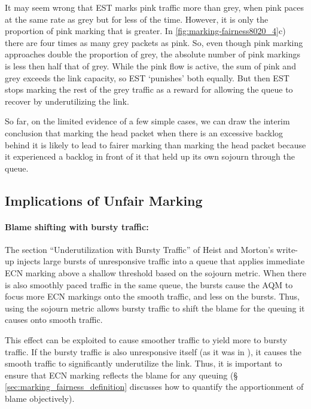 It may seem wrong that EST marks pink traffic more than grey, when pink paces at the same rate as grey but for less of the time. However, it is only the proportion of pink marking that is greater. In \autoref{fig:marking-fairness8020_4}c) there are four times as many grey packets as pink. So, even though pink marking approaches double the proportion of grey, the absolute number of pink markings is less then half that of grey. While the pink flow is active, the sum of pink and grey exceeds the link capacity, so EST `punishes' both equally. But then EST stops marking the rest of the grey traffic as a reward for allowing the queue to recover by underutilizing the link.

So far, on the limited evidence of a few simple cases, we can draw the interim conclusion that marking the head packet when there is an excessive backlog behind it is likely to lead to fairer marking than marking the head packet because it experienced a backlog in front of it that held up its own sojourn through the queue. 

\subsection{Implications of Unfair Marking}\label{sec:effects_unfair_marking}

\paragraph{Blame shifting with bursty traffic:} The section ``Underutilization with Bursty Traffic'' of Heist and Morton's write-up \cite{Heist20:L4S_tests} injects large bursts of unresponsive traffic into a queue that applies immediate ECN marking above a shallow threshold based on the sojourn metric. When there is also smoothly paced traffic in the same queue, the bursts cause the AQM to focus more ECN markings onto the smooth traffic, and less on the bursts. Thus, using the sojourn metric allows bursty traffic to shift the blame for the queuing it causes onto smooth traffic.

This effect can be exploited to cause smoother traffic to yield more to bursty traffic. If the bursty traffic is also unresponsive itself (as it was in \cite{Heist20:L4S_tests}), it causes the smooth traffic to significantly underutilize the link. Thus, it is important to ensure that ECN marking reflects the blame for any queuing (\S\,\ref{sec:marking_fairness_definition} discusses how to quantify the apportionment of blame objectively).

